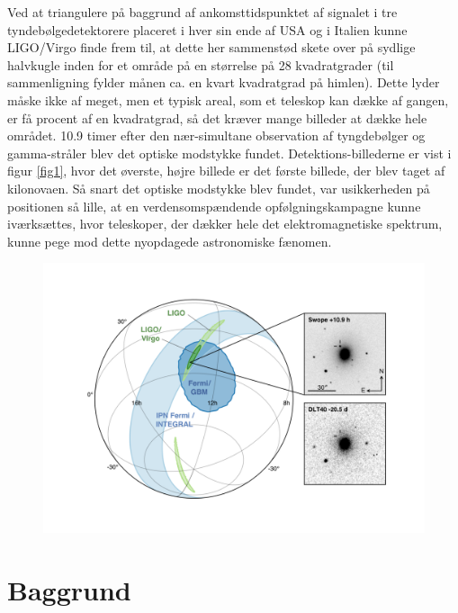 \documentclass[twocolumn]{article}
\begin{document}
Ved at triangulere på baggrund af ankomsttidspunktet af signalet i tre tyndebølgedetektorere placeret i hver sin ende af USA og i Italien kunne LIGO/Virgo finde frem til, at dette her sammenstød skete over på sydlige halvkugle inden for et område på en størrelse på 28 kvadratgrader (til sammenligning fylder månen ca. en kvart kvadratgrad på himlen). Dette lyder måske ikke af meget, men et typisk areal, som et teleskop kan dække af gangen, er få procent af en kvadratgrad, så det kræver mange billeder at dække hele området. 10.9 timer efter den nær-simultane observation af tyngdebølger og gamma-stråler blev det optiske modstykke fundet. Detektions-billederne er vist i figur \ref{fig1}, hvor det øverste, højre billede er det første billede, der blev taget af kilonovaen. Så snart det optiske modstykke blev fundet, var usikkerheden på positionen så lille, at en verdensomspændende opfølgningskampagne kunne iværksættes, hvor teleskoper, der dækker hele det elektromagnetiske spektrum, kunne pege mod dette nyopdagede astronomiske fænomen.

\begin{figure}
\includegraphics[width=\columnwidth]{GW170817_MMA_Skymap} 
\end{figure}





\section{Baggrund}\label{bag}
\end{document}
